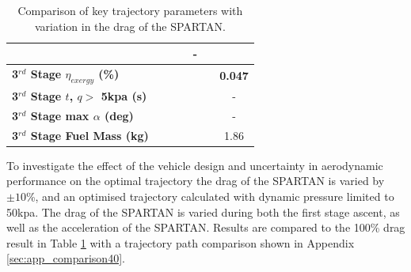 \begin{table}[ht!]
\begin{tabular}{l c c c c c c}
		& \secondFlightTimeCdStandardNoReturn
		& \secondFlightTimeCdOneHundredFiveNoReturn
		& \secondFlightTimeCdOneHundredTenNoReturn
		& -
		\\
		\hline 
		\textbf{3$^{rd}$ Stage $\eta_{exergy}$ (\%)}
		& \textbf{\thirddExergyEffCdNinetyNoReturn}
		& \textbf{\thirddExergyEffCdNinetyFiveNoReturn}
		& \textbf{\thirddExergyEffCdStandardNoReturn}
		& \textbf{\thirddExergyEffCdOneHundredFiveNoReturn}
		& \textbf{\thirddExergyEffCdOneHundredTenNoReturn}
		& \textbf{0.047}
		\\
		\textbf{3$^{rd}$ Stage $t$, $q >$ 5kpa (s)}
		& \thirdqOverFiveCdNinetyNoReturn
		& \thirdqOverFiveCdNinetyFiveNoReturn
		& \thirdqOverFiveCdStandardNoReturn
		& \thirdqOverFiveCdOneHundredFiveNoReturn
		& \thirdqOverFiveCdOneHundredTenNoReturn
		& -
		\\
		\textbf{3$^{rd}$ Stage max $\alpha$ (deg)}
		& \thirdmaxAoACdNinetyNoReturn
		& \thirdmaxAoACdNinetyFiveNoReturn
		& \thirdmaxAoACdStandardNoReturn
		& \thirdmaxAoACdOneHundredFiveNoReturn
		& \thirdmaxAoACdOneHundredTenNoReturn
		& -
		\\
		\textbf{3$^{rd}$ Stage Fuel Mass (kg)}
		& \thirdmFuelCdNinetyNoReturn
		& \thirdmFuelCdNinetyFiveNoReturn
		& \thirdmFuelCdStandardNoReturn
		& \thirdmFuelCdOneHundredFiveNoReturn
		& \thirdmFuelCdOneHundredTenNoReturn
		&1.86
		\\
		\hline 
	\end{tabular} 
	\caption{Comparison of key trajectory parameters with variation in the drag of the SPARTAN.}
	\label{tab:DragVariationNoReturn}
\end{table}

To investigate the effect of the vehicle design and uncertainty in aerodynamic performance on the optimal trajectory the drag of the SPARTAN is varied by $\pm10$\%, and an optimised trajectory calculated with dynamic pressure limited to 50kpa. The drag of the SPARTAN is varied during both the first stage ascent, as well as the acceleration of the SPARTAN. Results are compared to the 100\% drag result in Table \ref{tab:DragVariationNoReturn} with a trajectory path comparison shown in Appendix \ref{sec:app_comparison40}. 

